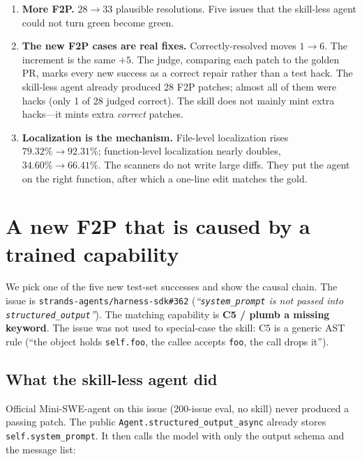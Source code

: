 \documentclass[11pt,a4paper]{article}
\begin{document}
\begin{enumerate}[leftmargin=1.3em,itemsep=3pt]
\item \textbf{More F2P.} $28 \rightarrow 33$ plausible resolutions.
      Five issues that the skill-less agent could not turn green
      become green.
\item \textbf{The new F2P cases are real fixes.} Correctly-resolved
      moves $1 \rightarrow 6$. The increment is the same $+5$.
      The judge, comparing each patch to the golden PR, marks
      every new success as a correct repair rather than a test
      hack. The skill-less agent already produced 28 F2P patches;
      almost all of them were hacks (only 1 of 28 judged correct).
      The skill does not mainly mint extra hacks---it mints
      extra \emph{correct} patches.
\item \textbf{Localization is the mechanism.} File-level localization
      rises $79.32\% \rightarrow 92.31\%$; function-level localization
      nearly doubles, $34.60\% \rightarrow 66.41\%$. The scanners
      do not write large diffs. They put the agent on the right
      function, after which a one-line edit matches the gold.
\end{enumerate}

\FloatBarrier

\section{A new F2P that is caused by a trained capability}
\label{sec:example}

We pick one of the five new test-set successes and show the
causal chain. The issue is
\texttt{strands-agents/harness-sdk\#362}
(\emph{``\texttt{system\_prompt} is not passed into
\texttt{structured\_output}''}). The matching capability is
\textbf{C5 / plumb a missing keyword}. The issue was not used to
special-case the skill: C5 is a generic AST rule
(``the object holds \texttt{self.foo}, the callee accepts
\texttt{foo}, the call drops it'').

\subsection{What the skill-less agent did}

Official Mini-SWE-agent on this issue (200-issue eval, no skill)
never produced a passing patch. The public
\texttt{Agent.structured\_output\_async} already stores
\texttt{self.system\_prompt}. It then calls the model with only
the output schema and the message list:
\end{document}
